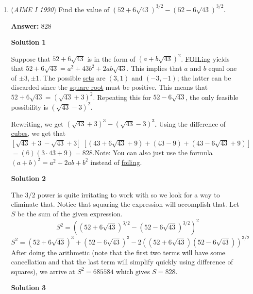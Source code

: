 \begin{enumerate}
 


	\item (\textit{AIME I 1990}) Find the value of $(52+6\sqrt{43})^{3/2}-(52-6\sqrt{43})^{3/2}$.


 
 \textbf{Answer: }828



\textbf{Solution 1}

Suppose that $52+6\sqrt{43}$ is in the form of $(a + b\sqrt{43})^2$. \href{https://artofproblemsolving.com/wiki/index.php?title=FOIL}{FOILing} yields that $52 + 6\sqrt{43} = a^2 + 43b^2 + 2ab\sqrt{43}$. This implies that $a$ and $b$ equal one of $\pm3, \pm1$. The possible \href{https://artofproblemsolving.com/wiki/index.php?title=Set}{sets} are $(3,1)$ and $(-3,-1)$; the latter can be discarded since the \href{https://artofproblemsolving.com/wiki/index.php?title=Square\_root}{square root} must be positive. This means that $52 + 6\sqrt{43} = (\sqrt{43} + 3)^2$. Repeating this for $52-6\sqrt{43}$, the only feasible possibility is $(\sqrt{43} - 3)^2$.

 Rewriting, we get $(\sqrt{43} + 3)^3 - (\sqrt{43} - 3)^3$. Using the difference of \href{https://artofproblemsolving.com/wiki/index.php?title=Cube}{cubes}, we get that $[\sqrt{43} + 3\ - \sqrt{43} + 3]\ [(43 + 6\sqrt{43} + 9) + (43 - 9) + (43 - 6\sqrt{43} + 9)]$ $= (6)(3 \cdot 43 + 9) = \boxed{828}$.Note: You can also just use the formula $(a + b)^2 = a^2 + 2ab + b^2$ instead of \href{https://artofproblemsolving.com/wiki/index.php?title=FOIL}{ foiling}.

 



\textbf{Solution 2}

The $3/2$ power is quite irritating to work with so we look for a way to eliminate that. Notice that squaring the expression will accomplish that. Let $S$ be the sum of the given expression. 
 \[S^2= ((52+6\sqrt{43})^{3/2}-(52-6\sqrt{43})^{3/2})^2\]
 \[S^2 = (52+6\sqrt{43})^{3} + (52-6\sqrt{43})^{3} - 2((52+6\sqrt{43})(52-6\sqrt{43}))^{3/2}\]After doing the arithmetic (note that the first two terms will have some cancellation and that the last term will simplify quickly using difference of squares), we arrive at $S^2 = 685584$ which gives $S=\boxed{828}$.

 



\textbf{Solution 3}


\end{enumerate}
